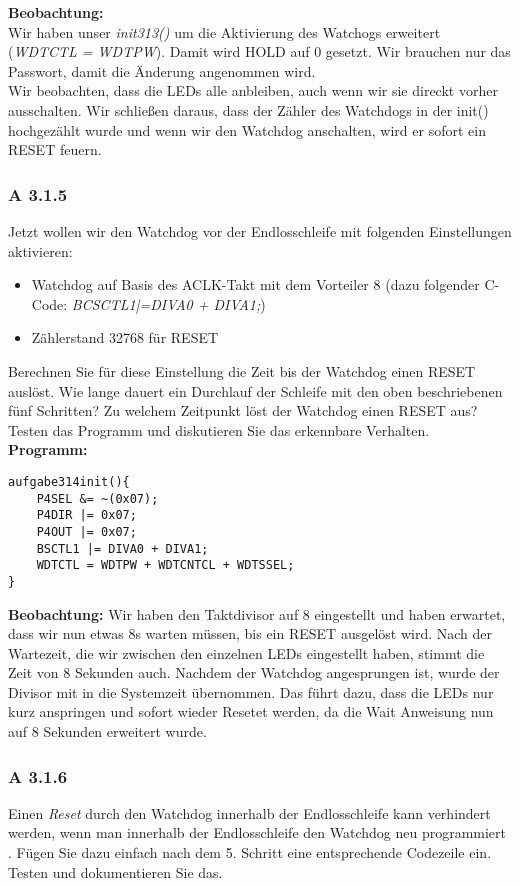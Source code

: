 	\textbf{Beobachtung:}\\
	Wir haben unser \emph{init313()} um die Aktivierung des Watchogs erweitert (\emph{WDTCTL = WDTPW}). Damit wird HOLD auf 0 gesetzt. Wir 	
	brauchen nur das Passwort, damit die Änderung angenommen wird.\\
	
	Wir beobachten, dass die LEDs alle anbleiben, auch wenn wir sie direckt vorher ausschalten. Wir schließen daraus, dass der Zähler des Watchdogs in 
	der init() hochgezählt wurde und wenn wir den Watchdog anschalten, wird er sofort ein RESET feuern.

\subsubsection*{A 3.1.5}
	Jetzt wollen wir den Watchdog vor der Endlosschleife mit folgenden Einstellungen aktivieren:
	\begin{itemize}
        		\item Watchdog auf Basis des ACLK-Takt mit dem Vorteiler 8
        			(dazu folgender C-Code: \emph{ BCSCTL1|=DIVA0 + DIVA1;})
        		\item Zählerstand 32768 für RESET
	\end{itemize}
	Berechnen Sie für diese Einstellung die Zeit bis der Watchdog einen RESET auslöst. Wie lange dauert ein Durchlauf der Schleife mit den oben 
	beschriebenen fünf Schritten? Zu welchem Zeitpunkt löst der Watchdog einen RESET aus? Testen das Programm und diskutieren Sie das erkennbare 
	Verhalten.\\

	\textbf{Programm:}
		\begin{lstlisting}
aufgabe314init(){
	P4SEL &= ~(0x07);
	P4DIR |= 0x07;
	P4OUT |= 0x07;
	BSCTL1 |= DIVA0 + DIVA1;
	WDTCTL = WDTPW + WDTCNTCL + WDTSSEL;
}
		\end{lstlisting}

	\textbf{Beobachtung:}
	Wir haben den Taktdivisor auf 8 eingestellt und haben erwartet, dass wir nun etwas 8s warten müssen, bis ein RESET ausgelöst wird. Nach der Wartezeit, die wir zwischen den einzelnen LEDs eingestellt haben, stimmt die Zeit von 8 Sekunden auch. Nachdem der Watchdog angesprungen ist, wurde der Divisor mit in die Systemzeit übernommen. Das führt dazu, dass die LEDs nur kurz anspringen und sofort wieder Resetet werden, da die Wait Anweisung nun auf 8 Sekunden erweitert wurde.

\subsubsection*{A 3.1.6}
	Einen \emph{Reset} durch den Watchdog innerhalb der Endlosschleife kann verhindert werden, wenn man innerhalb der Endlosschleife den Watchdog neu 
	programmiert . Fügen Sie dazu einfach nach dem 5. Schritt eine entsprechende Codezeile ein. Testen und dokumentieren Sie das.\\

